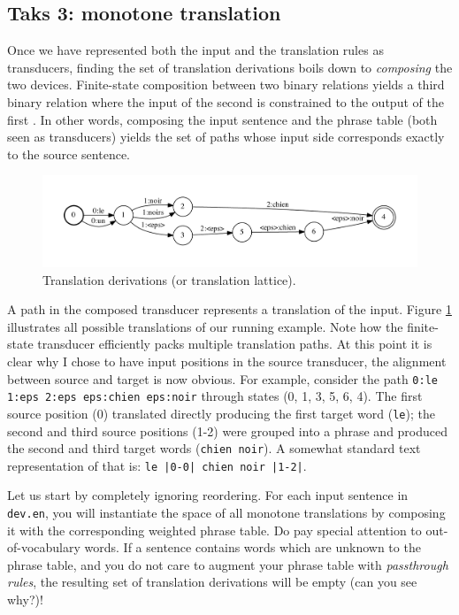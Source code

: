 \subsection{Taks 3: monotone translation}

Once we have represented both the input and the translation rules as transducers, finding the set of translation derivations boils down to \emph{composing} the two devices.
Finite-state composition between two binary relations yields a third binary relation where the input of the second is constrained to the output of the first \citep{Mohri:2009:WAA}.
In other words, composing the input sentence and the phrase table (both seen as transducers) yields the set of paths whose input side corresponds exactly to the source sentence.


\begin{figure}[h]\centering
\includegraphics[scale=0.5]{lattice-monotone}
\caption{\label{fig:lattice}Translation derivations (or translation lattice).}
\end{figure}


A path in the composed transducer represents a translation of the input. 
 Figure \ref{fig:lattice} illustrates all possible translations of our running example.
 Note how the finite-state transducer efficiently packs multiple translation paths.
At this point it is clear why I chose to have input positions in the source transducer, the alignment between source and target is now obvious.
For example, consider the path \texttt{0:le 1:eps 2:eps eps:chien eps:noir} through states (0, 1, 3, 5, 6, 4). The first source position (0) translated directly producing the first target word (\texttt{le}); the second and third source positions (1-2) were grouped into a phrase and produced the second and third target words (\texttt{chien noir}).
A somewhat standard text representation of that is: \texttt{le |0-0| chien noir |1-2|}.



Let us start by completely ignoring reordering.
For each input sentence in \texttt{dev.en}, you will instantiate the space of all monotone translations by composing it with the corresponding weighted phrase table.
Do pay special attention to out-of-vocabulary words. 
If a sentence contains words which are unknown to the phrase table, and you do not care to augment your phrase table with \emph{passthrough rules}, the resulting set of translation derivations will be empty (can you see why?)! 

